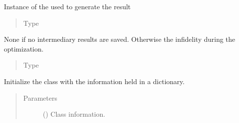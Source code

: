 \documentclass[letterpaper,10pt,english]{sphinxmanual}
\begin{document}
\begin{fulllineitems}
\begin{fulllineitems}
\begin{quote}
\begin{description}
\end{description}\end{quote}

\end{fulllineitems}


\begin{fulllineitems}
\label{\detokenize{qsim:qsim.optimization_data.OptimizationResult.optimizer}}
Instance of the  used to generate the result
\begin{quote}\begin{description}
\item[{Type}] \leavevmode
{}

\end{description}\end{quote}

\end{fulllineitems}


\begin{fulllineitems}
\label{\detokenize{qsim:qsim.optimization_data.OptimizationResult.optim_summary}}
None if no intermediary results are saved. Otherwise the infidelity
during the optimization.
\begin{quote}\begin{description}
\item[{Type}] \leavevmode
{}

\end{description}\end{quote}

\end{fulllineitems}


\begin{fulllineitems}
\label{\detokenize{qsim:qsim.optimization_data.OptimizationResult.from_dict}}
Initialize the class with the information held in a dictionary.
\begin{quote}\begin{description}
\item[{Parameters}] \leavevmode
{} () \textendash{} Class information.


\end{description}
\end{quote}
\end{fulllineitems}
\end{fulllineitems}
\end{document}
